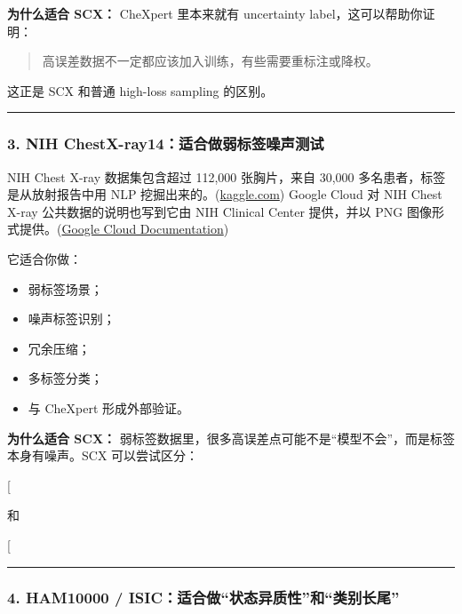 \documentclass[
  12pt,
]{ctexart}
\providecommand{\tightlist}{%
  \setlength{\itemsep}{0pt}\setlength{\parskip}{0pt}}
\begin{document}
\textbf{为什么适合 SCX：} CheXpert 里本来就有 uncertainty
label，这可以帮助你证明：

\begin{quote}
高误差数据不一定都应该加入训练，有些需要重标注或降权。
\end{quote}

这正是 SCX 和普通 high-loss sampling 的区别。

\begin{center}\rule{0.5\linewidth}{0.5pt}\end{center}

\subsubsection{3. NIH
ChestX-ray14：适合做弱标签噪声测试}\label{nih-chestx-ray14ux9002ux5408ux505aux5f31ux6807ux7b7eux566aux58f0ux6d4bux8bd5}

NIH Chest X-ray 数据集包含超过 112,000 张胸片，来自 30,000
多名患者，标签是从放射报告中用 NLP
挖掘出来的。(\href{https://arxiv.org/abs/2302.03169?utm_source=chatgpt.com}{kaggle.com})
Google Cloud 对 NIH Chest X-ray 公共数据的说明也写到它由 NIH Clinical
Center 提供，并以 PNG
图像形式提供。(\href{https://arxiv.org/abs/2405.13954?utm_source=chatgpt.com}{Google
Cloud Documentation})

它适合你做：

\begin{itemize}
\tightlist
\item
  弱标签场景；
\item
  噪声标签识别；
\item
  冗余压缩；
\item
  多标签分类；
\item
  与 CheXpert 形成外部验证。
\end{itemize}

\textbf{为什么适合 SCX：}
弱标签数据里，很多高误差点可能不是``模型不会''，而是标签本身有噪声。SCX
可以尝试区分：

{[} \text{learnable high-error state}{]}

和

{[} \text{noisy high-error sample}{]}

\begin{center}\rule{0.5\linewidth}{0.5pt}\end{center}

\subsubsection{4. HAM10000 /
ISIC：适合做``状态异质性''和``类别长尾''}\label{ham10000-isicux9002ux5408ux505aux72b6ux6001ux5f02ux8d28ux6027ux548cux7c7bux522bux957fux5c3e}
\end{document}
